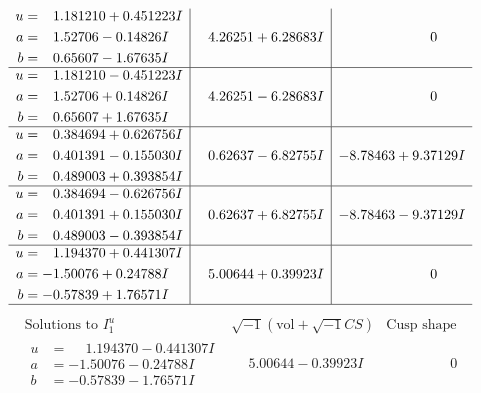 \documentclass[1p]{elsarticle_modified}
\theoremstyle{definition}
\newcommand{\I}{\sqrt{-1}}
\begin{document}
$$\begin{array}{c|c|c}
\begin{aligned}
u &= \phantom{-}1.181210 + 0.451223 I \\
a &= \phantom{-}1.52706 - 0.14826 I \\
b &= \phantom{-}0.65607 - 1.67635 I\end{aligned}
 & \phantom{-}4.26251 + 6.28683 I & \phantom{-0.000000 } 0 \\ \hline\begin{aligned}
u &= \phantom{-}1.181210 - 0.451223 I \\
a &= \phantom{-}1.52706 + 0.14826 I \\
b &= \phantom{-}0.65607 + 1.67635 I\end{aligned}
 & \phantom{-}4.26251 - 6.28683 I & \phantom{-0.000000 } 0 \\ \hline\begin{aligned}
u &= \phantom{-}0.384694 + 0.626756 I \\
a &= \phantom{-}0.401391 - 0.155030 I \\
b &= \phantom{-}0.489003 + 0.393854 I\end{aligned}
 & \phantom{-}0.62637 - 6.82755 I & -8.78463 + 9.37129 I \\ \hline\begin{aligned}
u &= \phantom{-}0.384694 - 0.626756 I \\
a &= \phantom{-}0.401391 + 0.155030 I \\
b &= \phantom{-}0.489003 - 0.393854 I\end{aligned}
 & \phantom{-}0.62637 + 6.82755 I & -8.78463 - 9.37129 I \\ \hline\begin{aligned}
u &= \phantom{-}1.194370 + 0.441307 I \\
a &= -1.50076 + 0.24788 I \\
b &= -0.57839 + 1.76571 I\end{aligned}
 & \phantom{-}5.00644 + 0.39923 I & \phantom{-0.000000 } 0\\
 \hline 
 \end{array}$$\newpage$$\begin{array}{c|c|c}  
\text{Solutions to }I^u_{1}& \I (\text{vol} + \sqrt{-1}CS) & \text{Cusp shape}\\
 \hline 
\begin{aligned}
u &= \phantom{-}1.194370 - 0.441307 I \\
a &= -1.50076 - 0.24788 I \\
b &= -0.57839 - 1.76571 I\end{aligned}
 & \phantom{-}5.00644 - 0.39923 I & \phantom{-0.000000 } 0 \\ \hline\begin{aligned}

\end{aligned}
\end{array}$$
\end{document}
